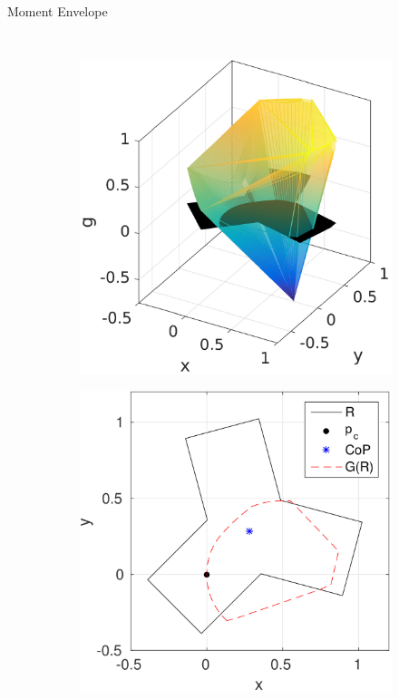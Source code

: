 \documentclass[10pt]{beamer}
\begin{document}
\begin{frame}{Moment Envelope}
\begin{columns}[c,onlytextwidth]
\begin{figure}[t]
\begin{subfigure}[b]{0.49\textwidth}
        \caption{}
      \end{subfigure}
      \begin{subfigure}[b]{0.49\textwidth}
        \centering
        \includegraphics[width=1\linewidth]{fig/moment_hull_3}
        \caption{}
      \end{subfigure}
      \begin{subfigure}[b]{0.49\textwidth}
        \centering
        \includegraphics[width=1\linewidth]{fig/CoP_boundary}

\end{subfigure}
\end{figure}
\end{columns}
\end{frame}
\end{document}
